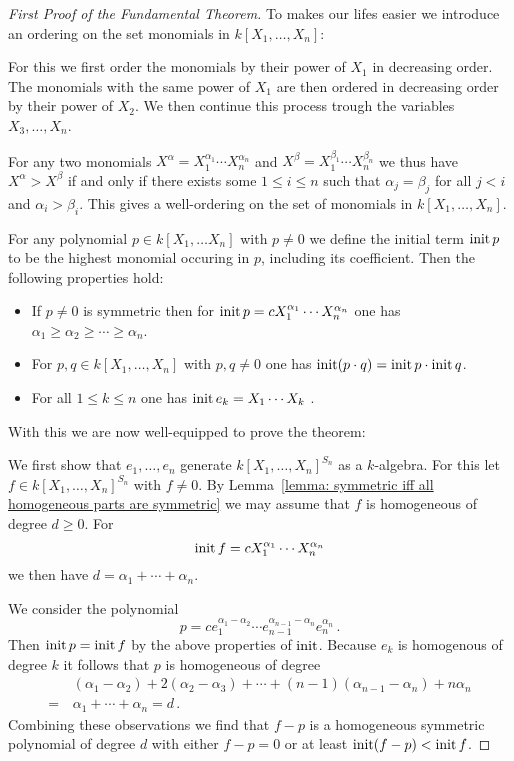 \begin{proof}[First Proof of the Fundamental Theorem]
  \label{label: first proof of fundamental theorem}
  To makes our lifes easier we introduce an ordering on the set monomials in $k[X_1, \dotsc, X_n]$:
  
  For this we first order the monomials by their power of $X_1$ in decreasing order.
  The monomials with the same power of $X_1$ are then ordered in decreasing order by their power of $X_2$.
  We then continue this process trough the variables $X_3, \dotsc, X_n$.
  
  For any two monomials $X^\alpha = X_1^{\alpha_1} \dotsm X_n^{\alpha_n}$ and $X^\beta = X_1^{\beta_1} \dotsm X_n^{\beta_n}$ we thus have $X^\alpha > X^\beta$ if and only if there exists some $1 \leq i \leq n$ such that $\alpha_j = \beta_j$ for all $j < i$ and $\alpha_i > \beta_i$.
  This gives a well-ordering on the set of monomials in $k[X_1, \dotsc, X_n]$.
  
  For any polynomial $p \in k[X_1, \dotsc X_n]$ with $p \neq 0$ we define the initial term $\operatorname{init} p$ to be the highest monomial occuring in $p$, including its coefficient.
  Then the following properties hold:
  \begin{itemize}
    \item
      If $p \neq 0$ is symmetric then for $\operatorname{init} p = c X_1^{\alpha_1} \dotsm X_n^{\alpha_n}$ one has $\alpha_1 \geq \alpha_2 \geq \dotsb \geq \alpha_n$.
    \item
      For $p, q \in k[X_1, \dotsc, X_n]$ with $p, q \neq 0$ one has $\operatorname{init} (p \cdot q) = \operatorname{init} p \cdot \operatorname{init} q$.
    \item
      For all $1 \leq k \leq n$ one has $\operatorname{init} e_k = X_1 \dotsm X_k$ .
  \end{itemize}
  With this we are now well-equipped to prove the theorem:
  
  We first show that $e_1, \dotsc, e_n$ generate $k[X_1, \dotsc, X_n]^{S_n}$ as a $k$-algebra.
  For this let $f \in k[X_1, \dotsc, X_n]^{S_n}$ with $f \neq 0$.
  By Lemma~\ref{lemma: symmetric iff all homogeneous parts are symmetric} we may assume that $f$ is homogeneous of degree $d \geq 0$.
  For
  \[
      \operatorname{init} f
    = c X_1^{\alpha_1} \dotsm X_n^{\alpha_n}
  \]
  we then have $d = \alpha_1 + \dotsb + \alpha_n$.
  
  We consider the polynomial
  \[
      p
    =         c
              e_1^{\alpha_1 - \alpha_2}
      \dotsm  e_{n-1}^{\alpha_{n-1} - \alpha_n}
              e_n^{\alpha_n} \,.
  \]
  Then $\operatorname{init} p = \operatorname{init} f$ by the above properties of $\operatorname{init}$.
  Because $e_k$ is homogenous of degree $k$ it follows that $p$ is homogeneous of degree
  \begin{align*}
     &\,  (\alpha_1-\alpha_2) + 2(\alpha_2-\alpha_3) + \dotsb + (n-1)(\alpha_{n-1}-\alpha_n) + n\alpha_n \\
    =&\,  \alpha_1 + \dotsb + \alpha_n
    =     d \,.
  \end{align*}
  Combining these observations we find that $f-p$ is a homogeneous symmetric polynomial of degree $d$ with either $f-p = 0$ or at least $\operatorname{init} (f-p) < \operatorname{init} f$.
  

\end{proof}

